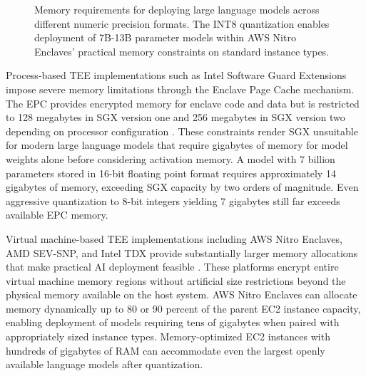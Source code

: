 \begin{figure}[htbp]
\caption{Memory requirements for deploying large language models across different numeric precision formats. The INT8 quantization enables deployment of 7B-13B parameter models within AWS Nitro Enclaves' practical memory constraints on standard instance types.}
\label{fig:model_memory}
\end{figure}

Process-based TEE implementations such as Intel Software Guard Extensions impose severe memory limitations through the Enclave Page Cache mechanism. The EPC provides encrypted memory for enclave code and data but is restricted to 128 megabytes in SGX version one and 256 megabytes in SGX version two depending on processor configuration \cite{sgx_explained}. These constraints render SGX unsuitable for modern large language models that require gigabytes of memory for model weights alone before considering activation memory. A model with 7 billion parameters stored in 16-bit floating point format requires approximately 14 gigabytes of memory, exceeding SGX capacity by two orders of magnitude. Even aggressive quantization to 8-bit integers yielding 7 gigabytes still far exceeds available EPC memory.

Virtual machine-based TEE implementations including AWS Nitro Enclaves, AMD SEV-SNP, and Intel TDX provide substantially larger memory allocations that make practical AI deployment feasible \cite{nitro_security, sev_snp, intel_tdx}. These platforms encrypt entire virtual machine memory regions without artificial size restrictions beyond the physical memory available on the host system. AWS Nitro Enclaves can allocate memory dynamically up to 80 or 90 percent of the parent EC2 instance capacity, enabling deployment of models requiring tens of gigabytes when paired with appropriately sized instance types. Memory-optimized EC2 instances with hundreds of gigabytes of RAM can accommodate even the largest openly available language models after quantization.

